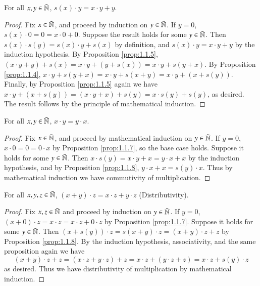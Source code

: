 \begin{prop}\label{prop:1.1.8}
    For all $x,y \in \tilde{\mathbb N}$, $s(x)\cdot y = x\cdot y + y$.
\end{prop}
\begin{proof}
    Fix $x \in \tilde{\mathbb N}$, and proceed by induction on $y \in \tilde{\mathbb N}$. If $y = 0$, $s(x)\cdot 0 = 0 = x\cdot 0 + 0$. Suppose the result holds for some $y \in \tilde{\mathbb N}$. Then $s(x)\cdot s(y) = s(x)\cdot y + s(x)$ by definition, and $s(x)\cdot y = x\cdot y + y$ by the induction hypothesis. By Proposition \ref{prop:1.1.5}, $(x\cdot y+y)+s(x) = x\cdot y + (y+s(x)) = x\cdot y + s(y+x)$. By Proposition \ref{prop:1.1.4}, $x\cdot y + s(y+x) = x\cdot y + s(x+y) = x\cdot y + (x+s(y))$. Finally, by Proposition \ref{prop:1.1.5} again we have $x\cdot y + (x+s(y)) = (x\cdot y + x) + s(y) = x\cdot s(y)+s(y)$, as desired. The result follows by the principle of mathematical induction.
\end{proof}

\begin{prop}\label{prop:1.1.9}
    For all $x,y \in \tilde{\mathbb N}$, $x\cdot y = y\cdot x$.
\end{prop}
\begin{proof}
    Fix $x \in \tilde{\mathbb N}$, and proceed by mathematical induction on $y \in \tilde{\mathbb N}$. If $y = 0$, $x \cdot 0 = 0 = 0\cdot x$ by Proposition \ref{prop:1.1.7}, so the base case holds. Suppose it holds for some $y \in \tilde{\mathbb N}$. Then $x\cdot s(y) = x\cdot y + x = y\cdot x + x$ by the induction hypothesis, and by Proposition \ref{prop:1.1.8}, $y\cdot x + x = s(y)\cdot x$. Thus by mathematical induction we have commutivity of multiplication.
\end{proof}

\begin{prop}\label{prop:1.1.10}
    For all $x,y,z \in \tilde{\mathbb N}$, $(x+y)\cdot z = x\cdot z + y \cdot z$ (Distributivity).
\end{prop}
\begin{proof}
    Fix $x,z \in  \tilde{\mathbb N}$ and proceed by induction on $y \in \tilde{\mathbb N}$. If $y = 0$, $(x+0)\cdot z = x\cdot z = x\cdot z + 0\cdot z$ by Proposition \ref{prop:1.1.7}. Suppose it holds for some $y \in \tilde{\mathbb N}$. Then $(x+s(y))\cdot z = s(x+y)\cdot z = (x+y)\cdot z + z$ by Proposition \ref{prop:1.1.8}. By the induction hypothesis, associativity, and the same proposition again we have $$(x+y)\cdot z + z = (x\cdot z + y \cdot z) + z = x\cdot z + (y\cdot z + z) = x\cdot z + s(y)\cdot z$$
    as desired. Thus we have distributivity of multiplication by mathematical induction.
\end{proof}

